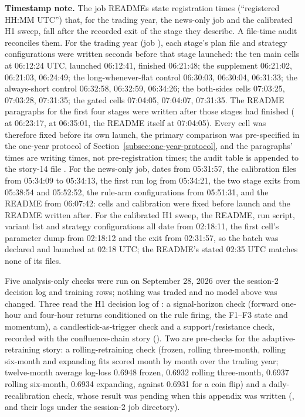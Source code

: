 \begin{apendicesenv}
\textbf{Timestamp note.} The job READMEs state registration times (``registered HH:MM UTC'') that, for the trading year, the news-only job and the calibrated H1 sweep, fall after the recorded exit of the stage they describe. A file-time audit reconciles them. For the trading year (job ), each stage's plan file and strategy configurations were written seconds before that stage launched: the ten main cells at 06:12:24 UTC, launched 06:12:41, finished 06:21:48; the supplement 06:21:02, 06:21:03, 06:24:49; the long-whenever-flat control 06:30:03, 06:30:04, 06:31:33; the always-short control 06:32:58, 06:32:59, 06:34:26; the both-sides cells 07:03:25, 07:03:28, 07:31:35; the gated cells 07:04:05, 07:04:07, 07:31:35. The README paragraphs for the first four stages were written after those stages had finished ( at 06:23:17,  at 06:35:01, the README itself at 07:04:05). Every cell was therefore fixed before its own launch, the primary comparison was pre-specified in the one-year protocol of Section~\ref{subsec:one-year-protocol}, and the paragraphs' times are writing times, not pre-registration times; the audit table is appended to the story-14 file . For the news-only job,  dates from 05:31:57, the calibration files from 05:34:09 to 05:34:13, the first run log from 05:34:21, the two stage exits from 05:38:54 and 05:52:52, the rule-arm configurations from 05:51:31, and the README from 06:07:42: cells and calibration were fixed before launch and the README written after. For the calibrated H1 sweep, the README, run script, variant list and strategy configurations all date from 02:18:11, the first cell's parameter dump from 02:18:12 and the exit from 02:31:57, so the batch was declared and launched at 02:18 UTC; the README's stated 02:35 UTC matches none of its files.

Five analysis-only checks were run on September 28, 2026 over the session-2 decision log and training rows; nothing was traded and no model above was changed. Three read the H1 decision log of : a signal-horizon check (forward one-hour and four-hour returns conditioned on the rule firing, the F1--F3 state and momentum), a candlestick-as-trigger check and a support/resistance check, recorded with the confluence-chain story (). Two are pre-checks for the adaptive-retraining story: a rolling-retraining check (frozen, rolling three-month, rolling six-month and expanding fits scored month by month over the trading year; twelve-month average log-loss 0.6948 frozen, 0.6932 rolling three-month, 0.6937 rolling six-month, 0.6934 expanding, against 0.6931 for a coin flip) and a daily-recalibration check, whose result was pending when this appendix was written (,  and their logs under the session-2 job directory).

\end{apendicesenv}

